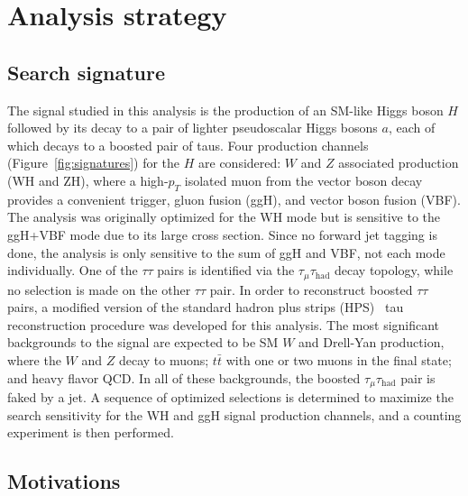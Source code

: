\chapter{Analysis strategy\label{sec:strategy}}

\section{Search signature\label{sec:signature}}
The signal studied in this analysis is the production of an SM-like Higgs boson $H$ followed by its decay to a pair of lighter pseudoscalar Higgs bosons $a$, each of which decays to a boosted pair of taus.  Four production channels (Figure~\ref{fig:signatures}) for the $H$ are considered: $W$ and $Z$ associated production (WH and ZH), where a high-$p_T$ isolated muon from the vector boson decay provides a convenient trigger, gluon fusion (ggH), and vector boson fusion (VBF). The analysis was originally optimized for the WH mode but is sensitive to the ggH+VBF mode due to its large cross section. Since no forward jet tagging is done, the analysis is only sensitive to the sum of ggH and VBF, not each mode individually.  One of the $\tau\tau$ pairs is identified via the $\tau_{\mu}\tau_{\text{had}}$ decay topology, while no selection is made on the other $\tau\tau$ pair.  In order to reconstruct boosted $\tau\tau$ pairs, a modified version of the standard hadron plus strips (HPS)~\cite{CMS:2011msa} tau reconstruction procedure was developed for this analysis. The most significant backgrounds to the signal are expected to be SM $W$ and Drell-Yan production, where the $W$ and $Z$ decay to muons; $t\bar{t}$ with one or two muons in the final state; and heavy flavor QCD. In all of these backgrounds, the boosted $\tau_{\mu}\tau_{\text{had}}$ pair is faked by a jet. A sequence of optimized selections is determined to maximize the search sensitivity for the WH and ggH signal production channels, and a counting experiment is then performed.

\section{Motivations\label{sec:motivations}}

